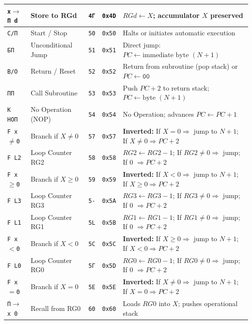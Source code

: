 \documentclass[11pt,a4paper]{article}
\begin{document}
{\begin{longtable}{p{2.2cm}p{3.0cm}>{\centering\arraybackslash}p{1.0cm}>{\centering\arraybackslash}p{1.2cm}p{7.3cm}}
\texttt{x$\to$П d} & Store to RGd & \texttt{4Г} & \texttt{0x4D} & $RGd \leftarrow X$; accumulator $X$ preserved \\
\midrule
\texttt{С/П} & Start / Stop & \texttt{50} & \texttt{0x50} & Halts or initiates automatic execution \\
\texttt{БП} & Unconditional Jump & \texttt{51} & \texttt{0x51} & Direct jump: $PC \leftarrow \text{immediate byte } (N+1)$ \\
\texttt{В/О} & Return / Reset & \texttt{52} & \texttt{0x52} & Return from subroutine (pop stack) or $PC \leftarrow \texttt{00}$ \\
\texttt{ПП} & Call Subroutine & \texttt{53} & \texttt{0x53} & Push $PC+2$ to return stack; $PC \leftarrow \text{byte } (N+1)$ \\
\texttt{K НОП} & No Operation (NOP) & \texttt{54} & \texttt{0x54} & No Operation; advances $PC \leftarrow PC+1$ \\
\texttt{F x$\ne$0} & Branch if $X \ne 0$ & \texttt{57} & \texttt{0x57} & \textbf{Inverted:} If $X = 0 \Rightarrow$ jump to $N+1$; If $X \ne 0 \Rightarrow PC+2$ \\
\texttt{F L2} & Loop Counter RG2 & \texttt{58} & \texttt{0x58} & $RG2 \leftarrow RG2-1$; If $RG2 \ne 0 \Rightarrow$ jump; If 0 $\Rightarrow PC+2$ \\
\texttt{F x$\ge$0} & Branch if $X \ge 0$ & \texttt{59} & \texttt{0x59} & \textbf{Inverted:} If $X < 0 \Rightarrow$ jump to $N+1$; If $X \ge 0 \Rightarrow PC+2$ \\
\texttt{F L3} & Loop Counter RG3 & \texttt{5-} & \texttt{0x5A} & $RG3 \leftarrow RG3-1$; If $RG3 \ne 0 \Rightarrow$ jump; If 0 $\Rightarrow PC+2$ \\
\texttt{F L1} & Loop Counter RG1 & \texttt{5L} & \texttt{0x5B} & $RG1 \leftarrow RG1-1$; If $RG1 \ne 0 \Rightarrow$ jump; If 0 $\Rightarrow PC+2$ \\
\texttt{F x$<$0} & Branch if $X < 0$ & \texttt{5C} & \texttt{0x5C} & \textbf{Inverted:} If $X \ge 0 \Rightarrow$ jump to $N+1$; If $X < 0 \Rightarrow PC+2$ \\
\texttt{F L0} & Loop Counter RG0 & \texttt{5Г} & \texttt{0x5D} & $RG0 \leftarrow RG0-1$; If $RG0 \ne 0 \Rightarrow$ jump; If 0 $\Rightarrow PC+2$ \\
\texttt{F x$=$0} & Branch if $X = 0$ & \texttt{5E} & \texttt{0x5E} & \textbf{Inverted:} If $X \ne 0 \Rightarrow$ jump to $N+1$; If $X = 0 \Rightarrow PC+2$ \\
\midrule
\texttt{П$\to$x 0} & Recall from RG0 & \texttt{60} & \texttt{0x60} & Loads $RG0$ into $X$; pushes operational stack \\

\end{longtable}}
\end{document}
